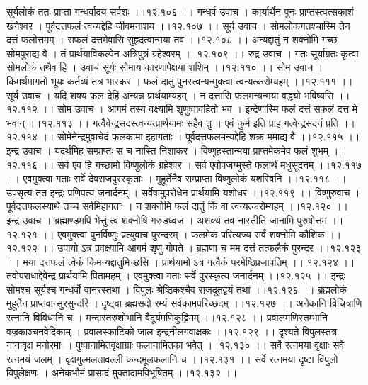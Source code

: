 \documentclass[11pt]{book}
\begin{document}
\begin{landscape}
सूर्यलोकं ततः प्राप्ता गन्धर्वादय सर्वशः ।।१२.१०६ ।।
गन्धर्व उवाच ।
कार्यार्थेन पुनः प्राप्तस्त्वत्सकाशं खगेश्वर ।
पूर्वदत्तफलं त्वन्यद्देहि जीवमनाशय ।।१२.१०७ ।।
सूर्य उवाच ।
सोमलोकगतश्चास्मि तेन दत्तं फलोत्तमम् ।
सफलं दत्तमेवासि सुहृदत्वान्मया तव ।।१२.१०८ ।।
अन्यद्दातुं न शक्नोमि गच्छ सोमपुराद्य वै ।
तं प्रार्थयाविकल्पेन अत्रिपुत्रं ग्रहेश्वरम् ।।१२.१०९ ।।
रुद्र उवाच ।
गतः सूर्याग्रतः कृत्वा सोमलोकं तथैव हि ।
उवाच सूर्यः सोमाय कारणापेक्षया शशिम् ।।१२.११० ।।
सोम उवाच ।
किमर्थमागतो भूयः कर्तव्यं तत्र भास्कर ।
फलं दातुं पुनस्त्वन्यन्मुक्त्वा त्वन्यत्करोम्यहम् ।।१२.१११ ।।
सूर्य उवाच ।
यदि शक्यं फलं देहि अन्यन्न प्रार्थयाम्यहम् ।
न दत्तासि फलमन्यन्मया वद्ध्यो भविष्यसि ।।१२.११२ ।।
सोम उवाच ।
आगमं तस्य वक्ष्यामि शृणुष्वावहितो भव ।
इन्द्रेणास्मि फलं दत्तं सफलं दत्त मे भवान् ।।१२.११३ ।।
गत्वैवेन्द्रसदस्त्वन्यत्प्रार्थयामः सहैव तु ।
एवं कुर्म इति प्राह गत्वेन्द्रसदनं प्रति ।।१२.११४ ।।
सोमेनेन्द्रमुवाचेदं फलकामा इहागताः ।
पूर्वदत्तफलमन्यद्देहि शक्र ममाद्य वै ।।१२.११५ ।।
इन्द्र उवाच ।
यदर्थमिह सम्प्राप्तः स च नास्ति निशाकर ।
विष्णुहस्तान्मया प्राप्तमेकमेव फलं शुभम् ।।१२.११६ ।।
सर्व एव हि गच्छामो विष्णुलोकं ग्रहेश्वर ।
सर्व एवोपजग्मुस्ते फलार्थं मधुसूदनम् ।।१२.११७ ।।
एवमुक्त्वा गताः सर्वे देवराजपुरस्कृताः ।
मुहूर्तेनैव सम्प्राप्ता विष्णुलोकं यशस्विनि ।।१२.११८ ।।
उपसृत्य तत इन्द्रः प्रणिपत्य जनार्दनम् ।
सर्वेषामुपरोधेन प्रार्थयामि यशोधर ।।१२.११९ ।।
विष्णुरुवाच ।
पूर्वदत्तफलस्यार्थे तच्च सर्वमिहागताः ।
न शक्नोमि फलं दातुं किं वा त्वन्यत्करोम्यहम् ।।१२.१२० ।।
इन्द्र उवाच ।
ब्रह्माण्डमपि भेत्तुं त्वं शक्नोषि गरुडध्वज ।
अशक्यं तव नास्तीति जानामि पुरुषोत्तम ।।१२.१२१ ।।
एवमुक्त्वा पुनर्विष्णुः प्रत्युवाच पुरन्दरम् ।
फलमेकं परित्यज्य सर्वं शक्नोमि कौशिक ।।१२.१२२ ।।
उपायो ऽत्र प्रवक्ष्यामि आगमं शृणु गोपते ।
ब्रह्मणा च मम दत्तं तत्फलैकं पुरन्दर ।।१२.१२३ ।।
मया दत्तफलं त्वेकं किमन्यद्दातुमिच्छसि ।
प्रार्थयामो ऽत्र गत्वैकं परमेष्ठिप्रजापतिम् ।। १२.१२४ ।।
तवोपराधाद्देवेन्द्र प्रार्थयामि पितामहम् ।
एवमुक्त्वा गताः सर्वे पुरस्कृत्य जनार्दनम् ।।१२.१२५ ।।
इन्द्रः सोमश्च सूर्यश्च गन्धर्वो वानरस्तथा ।
विपुलः श्रेष्ठिकश्चैव राजदूतद्वयं तथा ।।१२.१२६ ।।
ब्रह्मलोकं मुहूर्तेन प्राप्तवान्सुरसुन्दरि ।
दृष्ट्वा ब्रह्मसदो रम्यं सर्वकामपरिच्छदम् ।।१२.१२७ ।।
अनेकानि विचित्राणि रत्नानि विविधानि च ।
मन्दारतरुशोभानि वैदूर्यमणिकुट्टिमम् ।।१२.१२८ ।।
प्रवालमणिस्तम्भानि वज्रकाञ्चनवेदिकाम् ।
प्रवालस्फाटिको जाल इन्द्रनीलगवाक्षकः ।।१२.१२९ ।।
दृश्यते विपुलस्तत्र नानावृक्ष मनोरमाः ।
पुष्पानामितवृक्षाग्राः फलानामितका भवेत् ।।१२.१३० ।।
सर्वे रत्नमया वृक्षाः सर्वे रत्नमयं जलम् ।
वृक्षगुल्मलतावल्ली कन्दमूलफलानि च ।।१२.१३१ ।।
सर्वे रत्नमया दृष्टा विपुलो विपुलेक्षणः ।
अनेकभौमं प्रासादं मुक्तादामविभूषितम् ।।१२.१३२ ।।

\end{landscape}
\end{document}
